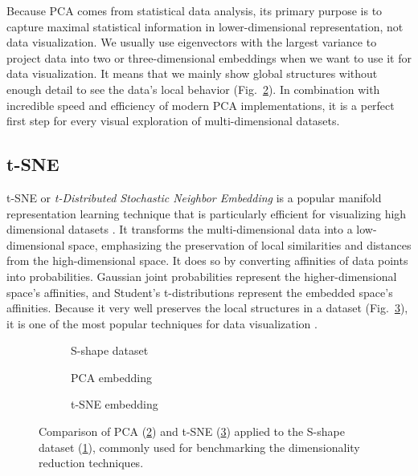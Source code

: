 Because PCA comes from statistical data analysis, its primary purpose is to capture maximal statistical information in lower-dimensional representation, not data visualization. We usually use eigenvectors with the largest variance to project data into two or three-dimensional embeddings when we want to use it for data visualization. It means that we mainly show global structures without enough detail to see the data's local behavior (Fig.~\ref{fig:pca-emb}). In combination with incredible speed and efficiency of modern PCA implementations, it is a perfect first step for every visual exploration of multi-dimensional datasets.

\subsection{t-SNE}
t-SNE or \textit{t-Distributed Stochastic Neighbor Embedding} \cite{vis:tsne} is a popular manifold representation learning technique that is particularly efficient for visualizing high dimensional datasets \cite{vis:repre-learning}. It transforms the multi-dimensional data into a low-dimensional space, emphasizing the preservation of local similarities and distances from the high-dimensional space. It does so by converting affinities of data points into probabilities. Gaussian joint probabilities represent the higher-dimensional space's affinities, and Student's t-distributions represent the embedded space's affinities. Because it very well preserves the local structures in a dataset (Fig.~\ref{fig:tsne}), it is one of the most popular techniques for data visualization \cite{vis:tsne-analysis}.
\begin{figure}[ht]
    \centering
    \begin{subfigure}[b]{0.33\textwidth}
        \centering
        
        \caption{S-shape dataset}
        \label{fig:s-shape-sub}
    \end{subfigure}
    \begin{subfigure}[b]{0.3\textwidth}
        \centering
        
        \caption{PCA embedding}
        \label{fig:pca-emb}
    \end{subfigure}
    \begin{subfigure}[b]{0.3\textwidth}
        \centering
        
        \caption{t-SNE embedding}
        \label{fig:tsne}
    \end{subfigure}
    
    \caption{Comparison of PCA (\ref{fig:pca-emb}) and t-SNE (\ref{fig:tsne}) applied to the S-shape dataset (\ref{fig:s-shape-sub}), commonly used for benchmarking the dimensionality reduction techniques.}
    \label{fig:s-shape}
\end{figure}

